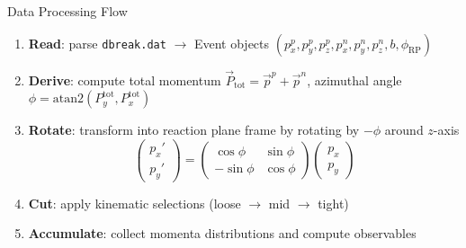 \documentclass[aspectratio=169,11pt]{beamer}
\begin{document}
\begin{frame}{Data Processing Flow}
\begin{enumerate}
  \item \textbf{Read}: parse \texttt{dbreak.dat} $\to$ Event objects $(p_x^p, p_y^p, p_z^p, p_x^n, p_y^n, p_z^n, b, \phi_\text{RP})$
  \item \textbf{Derive}: compute total momentum $\vec{P}_\text{tot} = \vec{p}^p + \vec{p}^n$, azimuthal angle $\phi = \text{atan2}(P_y^\text{tot}, P_x^\text{tot})$
  \item \textbf{Rotate}: transform into reaction plane frame by rotating by $-\phi$ around $z$-axis
        \[
          \begin{pmatrix} p_x' \\ p_y' \end{pmatrix} =
          \begin{pmatrix} \cos\phi & \sin\phi \\ -\sin\phi & \cos\phi \end{pmatrix}
          \begin{pmatrix} p_x \\ p_y \end{pmatrix}
        \]
  \item \textbf{Cut}: apply kinematic selections (loose $\to$ mid $\to$ tight)
  \item \textbf{Accumulate}: collect momenta distributions and compute observables
\end{enumerate}
\end{frame}
\end{document}
